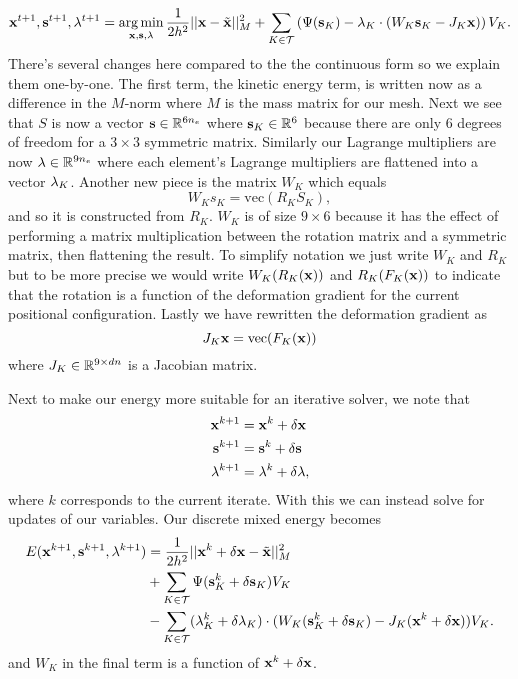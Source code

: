 \begin{equation}
\mathbf{x}^{t+1}, \mathbf{s}^{t+1}, \mathbf{\lambda}^{t+1} = \operatorname*{arg\,min}_{\mathbf{x},\mathbf{s},\mathbf{\lambda}} \frac{1}{2h^2}||\mathbf{x} - \tilde{\mathbf{x}}||_M^2 
+ \sum_{K \in \mathcal{T}} \left( \Psi(\mathbf{s}_K) - \mathbf{\lambda}_K \cdot (W_K \mathbf{s}_K - J_K \mathbf{x}) \right) V_K.
\end{equation}
There's several changes here compared to the the continuous form so we explain them one-by-one. The first term, the kinetic energy term, is written now as a difference in the $M$-norm where $M$ is the mass matrix for our mesh. Next we see that $S$ is now a vector $\mathbf{s} \in \mathbb{R}^{6n_e}$ where $\mathbf{s}_K \in \mathbb{R}^6$ because there are only 6 degrees of freedom for a $3 \times 3$ symmetric matrix. Similarly our Lagrange multipliers are now $\mathbf{\lambda} \in \mathbb{R}^{9n_e}$ where each element's Lagrange multipliers are flattened into a vector $\mathbf{\lambda}_K$. Another new piece is the matrix $W_K$ which equals
\begin{equation}
W_K s_K = \text{vec}(R_K S_K),
\end{equation}
and so it is constructed from $R_K$. $W_K$ is of size $9 \times 6$ because it has the effect of performing a matrix multiplication between the rotation matrix and a symmetric matrix, then flattening the result. To simplify notation we just write $W_K$ and $R_K$ but to be more precise we would write $W_K(R_K(\mathbf{x}))$ and $R_K(F_K(\mathbf{x}))$ to indicate that the rotation is a function of the deformation gradient for the current positional configuration. Lastly we have rewritten the deformation gradient as
\begin{equation}
J_K \mathbf{x} = \text{vec}(F_K(\mathbf{x}))
\end{equation}
where $J_K \in \mathbb{R}^{9 \times dn}$ is a Jacobian matrix. 

Next to make our energy more suitable for an iterative solver, we note that
\begin{align*}
\mathbf{x}^{k+1} &= \mathbf{x}^k + \delta \mathbf{x} \\
\mathbf{s}^{k+1} &= \mathbf{s}^k + \delta \mathbf{s} \\
\mathbf{\lambda}^{k+1} &= \mathbf{\lambda}^k + \delta \mathbf{\lambda},
\end{align*}
where $k$ corresponds to the current iterate. With this we can instead solve for updates of our variables. Our discrete mixed energy becomes
\begin{equation}
\begin{split}
E(\mathbf{x}^{k+1}, \mathbf{s}^{k+1}, \mathbf{\lambda}^{k+1}) &= \frac{1}{2h^2}||\mathbf{x}^k + \delta \mathbf{x} - \tilde{\mathbf{x}}||_M^2 \\
&+ \sum_{K \in \mathcal{T}} \Psi(\mathbf{s}_K^k + \delta \mathbf{s}_K) V_K  \\
&-  \sum_{K \in \mathcal{T}} (\mathbf{\lambda}_K^k + \delta \mathbf{\lambda}_K) \cdot (W_K (\mathbf{s}_K^k + \delta \mathbf{s}_K) - J_K(\mathbf{x}^k + \delta \mathbf{x})) V_K.
\end{split}
\end{equation}
and $W_K$ in the final term is a function of $\mathbf{x}^k + \delta \mathbf{x}$. 

